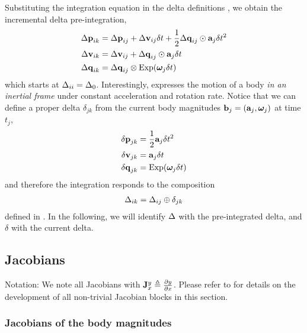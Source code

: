 Substituting the integration equation  in the delta definitions , we obtain the incremental delta pre-integration,
%
\begin{align}\label{equ:g_second_order_pre-integration}
\begin{split}
{\Delta{\bf p}}_{ik} 
&= {\Delta{\bf p}}_{ij} + {\Delta{\bf v}}_{ij}\delta t + \frac12{\Delta{\bf q}}_{ij}\odot{\bf a}_j\delta t^2 \\
{\Delta{\bf v}}_{ik} 
&= {\Delta{\bf v}}_{ij} + {\Delta{\bf q}}_{ij}\odot{\bf a}_j\delta t \\
{\Delta{\bf q}}_{ik} 
&= {\Delta{\bf q}}_{ij}\otimes\operatorname*{Exp}({{\bm \omega}}_j\delta t) 
\end{split}
\end{align}
%
which starts at $\Delta_{ii}=\Delta_0$. Interestingly,  expresses the motion of a body \emph{in an inertial frame} under constant acceleration and rotation rate.
Notice that we can define a proper delta $\delta_{jk}$ from the current body magnitudes ${\bf b}_j=({\bf a}_j,{{\bm \omega}}_j)$ at time $t_j$,
%
\begin{align}\label{equ:delta_creation}
\begin{split}
{\delta{\bf p}}_{jk} &= \frac12{\bf a}_j\delta t^2 \\
{\delta{\bf v}}_{jk} &= {\bf a}_j\delta t \\
{\delta{\bf q}}_{jk} &= \operatorname*{Exp}({{\bm \omega}}_j\delta t)
\end{split}
\end{align}
%
and therefore the integration  responds to the composition 
%
\begin{align}\label{equ:composition_compact}
\Delta_{ik}=\Delta_{ij}\oplus\delta_{jk}
\end{align}
%
defined in . In the following, we will identify $\Delta$ with the pre-integrated delta, and $\delta$ with the current delta.


\subsection{Jacobians}

\newcommand{\jac}[2]{{\bfJ^{#1}_{#2}}}

Notation: 
We note all Jacobians with $\jac{y}{x}\te\dpar{y}{x}$. 
Please refer to  for details on the development of all non-trivial Jacobian blocks in this section.



\subsubsection{Jacobians of the body magnitudes}

